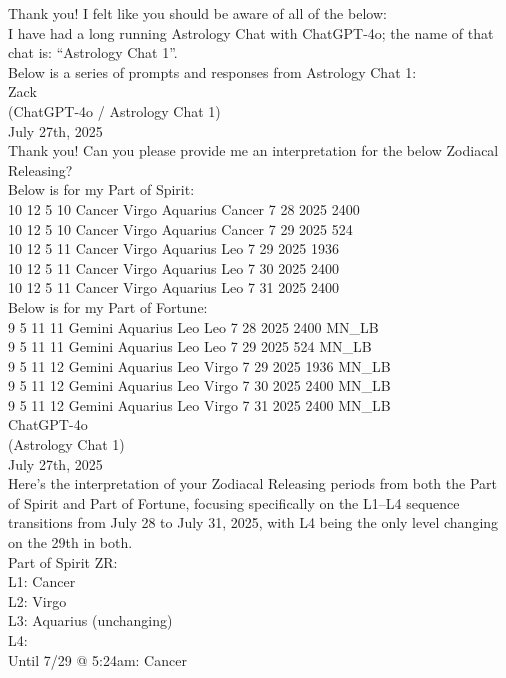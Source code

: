 \documentclass{article}
\begin{document}
Thank you! I felt like you should be aware of all of the below:\\
I have had a long running Astrology Chat with ChatGPT-4o; the name of
that chat is: ``Astrology Chat 1''.\\
Below is a series of prompts and responses from Astrology Chat 1:\\
Zack\\
(ChatGPT-4o / Astrology Chat 1)\\
July 27th, 2025\\
Thank you! Can you please provide me an interpretation for the below
Zodiacal Releasing?\\
Below is for my Part of Spirit:\\
10 12 5 10 Cancer Virgo Aquarius Cancer 7 28 2025 2400\\
10 12 5 10 Cancer Virgo Aquarius Cancer 7 29 2025 524\\
10 12 5 11 Cancer Virgo Aquarius Leo 7 29 2025 1936\\
10 12 5 11 Cancer Virgo Aquarius Leo 7 30 2025 2400\\
10 12 5 11 Cancer Virgo Aquarius Leo 7 31 2025 2400\\
Below is for my Part of Fortune:\\
9 5 11 11 Gemini Aquarius Leo Leo 7 28 2025 2400 MN\_LB\\
9 5 11 11 Gemini Aquarius Leo Leo 7 29 2025 524 MN\_LB\\
9 5 11 12 Gemini Aquarius Leo Virgo 7 29 2025 1936 MN\_LB\\
9 5 11 12 Gemini Aquarius Leo Virgo 7 30 2025 2400 MN\_LB\\
9 5 11 12 Gemini Aquarius Leo Virgo 7 31 2025 2400 MN\_LB\\
ChatGPT-4o\\
(Astrology Chat 1)\\
July 27th, 2025\\
Here's the interpretation of your Zodiacal Releasing periods from both
the Part of Spirit and Part of Fortune, focusing specifically on the
L1--L4 sequence transitions from July 28 to July 31, 2025, with L4 being
the only level changing on the 29th in both.\\
 Part of Spirit ZR:\\
L1: Cancer\\
L2: Virgo\\
L3: Aquarius (unchanging)\\
L4:\\
Until 7/29 @ 5:24am: Cancer\\
\end{document}
